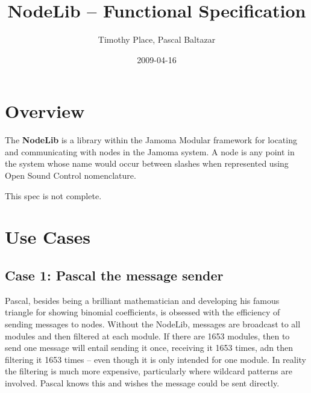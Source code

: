 \documentclass[]{article}
\title{NodeLib -- Functional Specification}
\author{ Timothy Place, Pascal Baltazar }
\date{2009-04-16}
\begin{document}
\ifpdf
{}
\else
{}
\fi

\maketitle


\begin{abstract}
\end{abstract}





\section{Overview}

The \textbf{NodeLib} is a library within the Jamoma Modular framework for locating and communicating with nodes in the Jamoma system.  A node is any point in the system whose name would occur between slashes when represented using Open Sound Control nomenclature.  

This spec is not complete.



\section{Use Cases}

\subsection{Case 1: Pascal the message sender}

Pascal, besides being a brilliant mathematician and developing his famous triangle for showing binomial coefficients, is obsessed with the efficiency of sending messages to nodes.  Without the NodeLib, messages are broadcast to all modules and then filtered at each module.  If there are 1653 modules, then to send one message will entail sending it once, receiving it 1653 times, adn then filtering it 1653 times -- even though it is only intended for one module.  In reality the filtering is much more expensive, particularly where wildcard patterns are involved.  Pascal knows this and wishes the message could be sent directly.
\end{document}
